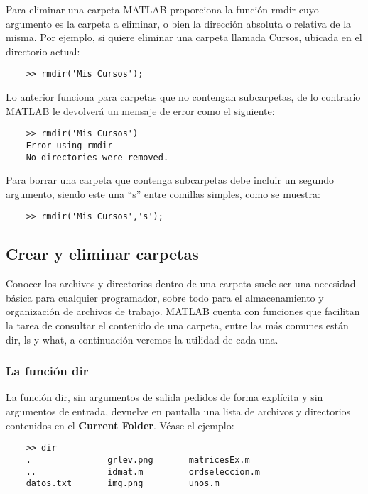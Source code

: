 Para eliminar una carpeta MATLAB proporciona la función rmdir cuyo argumento es la 
carpeta a eliminar, o bien la dirección absoluta o relativa de la misma. Por ejemplo, 
si quiere eliminar una carpeta llamada Cursos, ubicada en el directorio actual:

\begin{verbatim}
	>> rmdir('Mis Cursos');
\end{verbatim}

Lo anterior funciona para carpetas que no contengan subcarpetas, de lo contrario 
MATLAB le devolverá un mensaje de error como el siguiente:

\begin{verbatim}
	>> rmdir('Mis Cursos')
	Error using rmdir
	No directories were removed.
\end{verbatim}

Para borrar una carpeta que contenga subcarpetas debe incluir un segundo argumento, 
siendo este una “s” entre comillas simples, como se muestra:

\begin{verbatim}
	>> rmdir('Mis Cursos','s');
\end{verbatim}

\subsection{Crear y eliminar carpetas}

Conocer los archivos y directorios dentro de una carpeta suele ser una necesidad 
básica para cualquier programador, sobre todo para el almacenamiento y organización 
de archivos de trabajo. MATLAB cuenta con funciones que facilitan la tarea de consultar 
el contenido de una carpeta, entre las más comunes están dir, ls y what, a continuación 
veremos la utilidad de cada una.

\subsubsection{La función dir}

La función dir, sin argumentos de salida pedidos de forma explícita y sin argumentos 
de entrada, devuelve en pantalla una lista de archivos y directorios contenidos en 
el \textbf{Current Folder}. Véase el ejemplo:

\begin{verbatim}
	>> dir
	.               grlev.png       matricesEx.m    
	..              idmat.m         ordseleccion.m  
	datos.txt       img.png         unos.m     
\end{verbatim}

